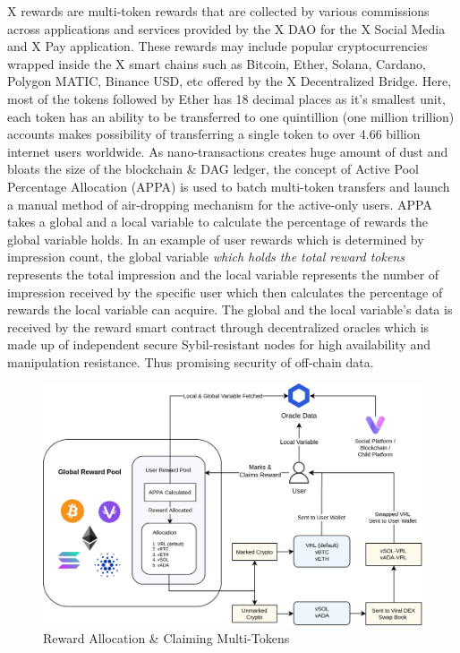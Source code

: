 \documentclass[letterpaper,11pt]{article}
\begin{document}
X rewards are multi-token rewards that are collected by various commissions across applications and services provided by the X DAO for the X Social Media and X Pay application. These rewards may include popular cryptocurrencies wrapped inside the X smart chains such as Bitcoin, Ether, Solana, Cardano, Polygon MATIC, Binance USD, etc offered by the X Decentralized Bridge. Here, most of the tokens followed by Ether has 18 decimal places as it's smallest unit, each token has an ability to be transferred to one quintillion (one million trillion) accounts makes possibility of transferring a single token to over 4.66 billion internet users worldwide.  As nano-transactions creates huge amount of dust and bloats the size of the blockchain \& DAG ledger, the concept of Active Pool Percentage Allocation (APPA) is used to batch multi-token transfers and launch a manual method of air-dropping mechanism for the active-only users.  APPA takes a global and a local variable to calculate the percentage of rewards the global variable holds. In an example of user rewards which is determined by impression count, the global variable \textit{which holds the total reward tokens} represents the total impression and the local variable represents the number of impression received by the specific user which then calculates the percentage of rewards the local variable can acquire. The global and the local variable's data is received by the reward smart contract through decentralized oracles which  is made up of independent secure Sybil-resistant nodes for high availability and manipulation resistance. Thus promising security of off-chain data. \\

\begin{figure}
\begin{center}
\includegraphics[width=12cm]{portfolio-reward}
\caption{Reward Allocation \& Claiming Multi-Tokens }
\end{center}
\end{figure}
\end{document}
